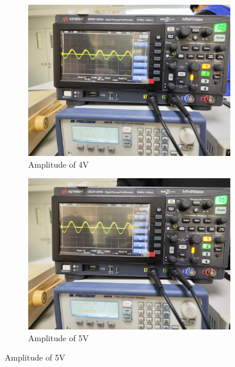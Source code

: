 \begin{itemize}
\begin{figure}[H]
            \begin{subfigure}{0.3\textwidth}
                \centering
                \includegraphics[width=1\linewidth]{Experiment_12/Images/RetB 50-4-min.jpg}
                \caption{Amplitude of 4V}
                \label{l124wf2}
            \end{subfigure}
            \begin{subfigure}{0.3\textwidth}
                \centering
                \includegraphics[width=1\linewidth]{Experiment_12/Images/RetB 50-5-min.jpg}
                \caption{Amplitude of 5V}
                \label{l125wf2}
            \end{subfigure}
        \end{figure}


\end{itemize}
